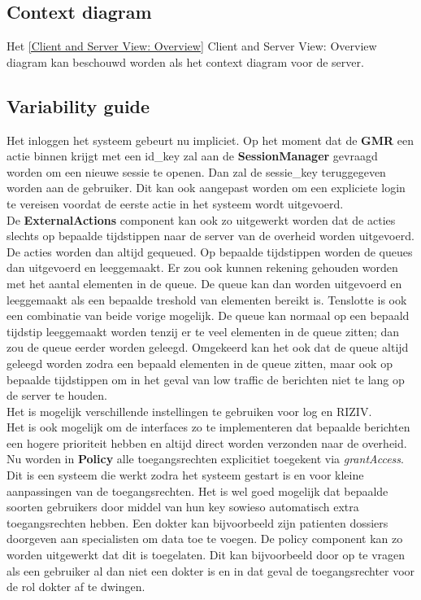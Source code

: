 \documentclass[a4paper,10pt]{article}
\begin{document}
\subsection{Context diagram}
Het \ref{Client and Server View: Overview} Client and Server View: Overview diagram kan beschouwd worden als het context diagram voor de server.

\subsection{Variability guide}
\label{gmr:variability}
Het inloggen het systeem gebeurt nu impliciet.  Op het moment dat de \textbf{GMR} een actie binnen krijgt met een id\_key zal aan de \textbf{SessionManager} gevraagd worden om een nieuwe sessie te openen.  Dan zal de sessie\_key teruggegeven worden aan de gebruiker.  Dit kan ook aangepast worden om een expliciete login te vereisen voordat de eerste actie in het systeem wordt uitgevoerd.\\

De \textbf{ExternalActions} component kan ook zo uitgewerkt worden dat de acties slechts op bepaalde tijdstippen naar de server van de overheid worden uitgevoerd.  De acties worden dan altijd gequeued.  Op bepaalde tijdstippen worden de queues dan uitgevoerd en leeggemaakt.  Er zou ook kunnen rekening gehouden worden met het aantal elementen in de queue.  De queue kan dan worden uitgevoerd en leeggemaakt als een bepaalde treshold van elementen bereikt is.  Tenslotte is ook een combinatie van beide vorige mogelijk.  De queue kan normaal op een bepaald tijdstip leeggemaakt worden tenzij er te veel elementen in de queue zitten; dan zou de queue eerder worden geleegd.  Omgekeerd kan het ook dat de queue altijd geleegd worden zodra een bepaald elementen in de queue zitten, maar ook op bepaalde tijdstippen om in het geval van low traffic de berichten niet te lang op de server te houden.\\
Het is mogelijk verschillende instellingen te gebruiken voor log en RIZIV.\\
Het is ook mogelijk om de interfaces zo te implementeren dat bepaalde berichten een hogere prioriteit hebben en altijd direct worden verzonden naar de overheid.\\

Nu worden in \textbf{Policy} alle toegangsrechten explicitiet toegekent via \textit{grantAccess}.  Dit is een systeem die werkt zodra het systeem gestart is en voor kleine aanpassingen van de toegangsrechten.  Het is wel goed mogelijk dat bepaalde soorten gebruikers door middel van hun key sowieso automatisch extra toegangsrechten hebben.  Een dokter kan bijvoorbeeld zijn patienten dossiers doorgeven aan specialisten om data toe te voegen.  De policy component kan zo worden uitgewerkt dat dit is toegelaten.  Dit kan bijvoorbeeld door op te vragen als een gebruiker al dan niet een dokter is en in dat geval de toegangsrechter voor de rol dokter af te dwingen.
\end{document}
